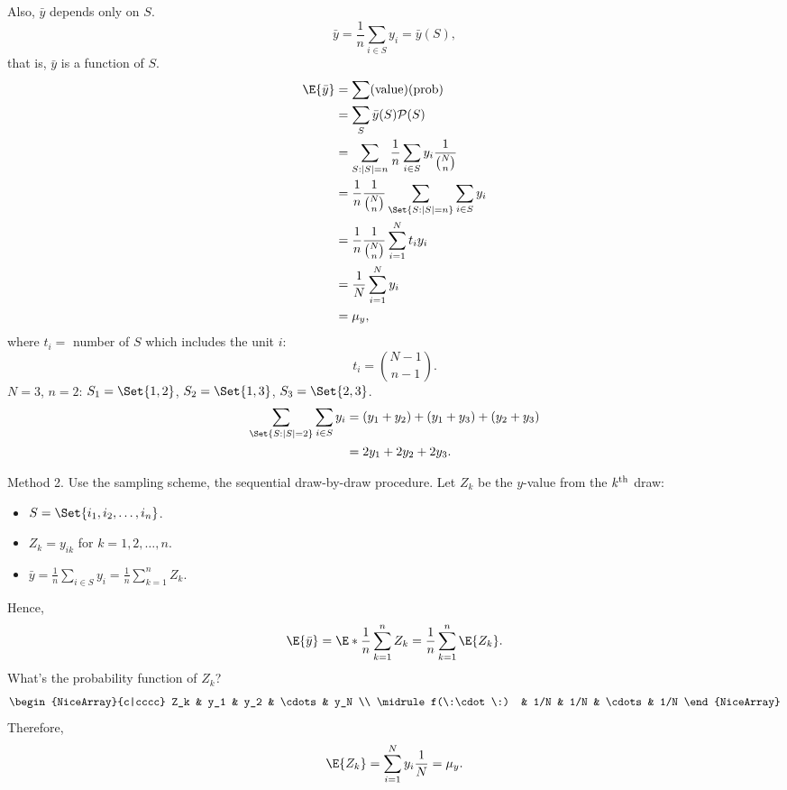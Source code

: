Also, $ \bar{y} $ depends only on $ S $.
\[ \bar{y}=\frac{1}{n}\sum_{i\in S}y_i=\bar{y}(S), \]
that is, $ \bar{y} $ is a function of $ S $.
\begin{align*}
      \E{\bar{y}}
       & =\sum(\text{value})(\text{prob})                                                  \\
       & =\sum_S \bar{y}(S)\mathcal{P}(S)                                                  \\
       & =\sum_{S:\abs{S}=n}\frac{1}{n}\sum_{i\in S}y_i \frac{1}{\binom{N}{n}}             \\
       & =\frac{1}{n}\frac{1}{\binom{N}{n}}\sum_{\Set{S\given \abs{S}=n}} \sum_{i\in S}y_i \\
       & =\frac{1}{n}\frac{1}{\binom{N}{n}}\sum_{i=1}^{N}t_i y_i                           \\
       & =\frac{1}{N}\sum_{i=1}^{N}y_i                                                     \\
       & =\mu_y,
\end{align*}
where $ t_i = $ number of $S$ which includes the unit $ i $:
\[ t_i=\binom{N-1}{n-1}. \]
$ N=3 $, $ n=2 $: $ S_1=\Set{1,2} $, $ S_2=\Set{1,3} $, $ S_3=\Set{2,3} $.
\begin{align*}
      \sum_{\Set{S\given\abs{S}=2}} \sum_{i\in S}y_i
       & =(y_1+y_2)+(y_1+y_3)+(y_2+y_3) \\
       & =2 y_1+2y_2+2y_3.
\end{align*}

Method 2. Use the sampling scheme, the sequential
draw-by-draw procedure. Let $ Z_k $ be the $ y $-value from the
$ k\textsuperscript{th} $ draw:
\begin{itemize}
      \item $ S=\Set{i_1,i_2,\ldots,i_n} $.
      \item $ Z_k=y_{ik} $ for $k=1,2,\ldots,n$.
      \item $ \bar{y}=\frac{1}{n}\sum_{i\in S}y_i=\frac{1}{n}\sum_{k=1}^{n}Z_k $.
\end{itemize}
Hence,
\[ \E{\bar{y}}=\E*{\frac{1}{n}\sum_{k=1}^n Z_k}
      =\frac{1}{n}\sum_{k=1}^{n}\E{Z_k}. \]
What's the probability function of $ Z_k $?
\[ \begin{NiceArray}{c|cccc}
            Z_k          & y_1 & y_2 & \cdots & y_N \\
            \midrule
            f(\:\cdot\:) & 1/N & 1/N & \cdots & 1/N
      \end{NiceArray} \]
Therefore,
\[ \E{Z_k}=\sum_{i=1}^{N}y_i \frac{1}{N}=\mu_y. \]

